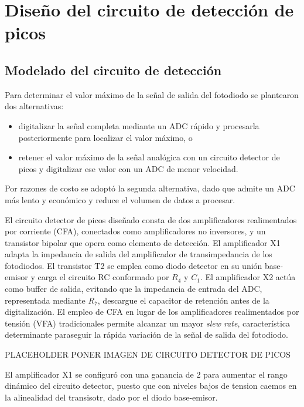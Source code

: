 \chapter{Diseño del circuito de detección de picos}
\label{cap:diseno_deteccion_picos}

\section{Modelado del circuito de detección}
\label{sec:modelado_simulacion}

Para determinar el valor máximo de la señal de salida del fotodiodo se plantearon dos alternativas:

\begin{itemize}
  \item digitalizar la señal completa mediante un ADC rápido y
        procesarla posteriormente para localizar el valor máximo, o
  \item retener el valor máximo de la señal analógica con un circuito
        detector de picos y digitalizar ese valor con un ADC de menor
        velocidad.
\end{itemize}

Por razones de costo se adoptó la segunda alternativa, dado que admite un ADC más lento y económico y reduce el volumen de datos a procesar.

El circuito detector de picos diseñado consta de dos amplificadores realimentados por corriente (CFA), conectados como amplificadores no inversores, y un transistor bipolar que opera como elemento de detección. El amplificador X1 adapta la impedancia de salida del amplificador de transimpedancia de los fotodiodos. El transistor T2 se emplea como diodo detector en su unión base-emisor y carga el circuito RC conformado por $R_4$ y $C_1$. El amplificador X2 actúa como buffer de salida, evitando que la impedancia de entrada del ADC, representada mediante $R_7$, descargue el capacitor de retención antes de la digitalización. El empleo de CFA en lugar de los amplificadores realimentados por tensión (VFA) tradicionales permite alcanzar un mayor \emph{slew rate}, característica determinante paraseguir la rápida variación de la señal de salida del fotodiodo.

PLACEHOLDER PONER IMAGEN DE CIRCUITO DETECTOR DE PICOS

El amplificador X1 se configuró con una ganancia de 2 para aumentar el rango dinámico del circuito detector, puesto que con niveles bajos de tension caemos en la alinealidad del transisotr, dado por el diodo base-emisor.

